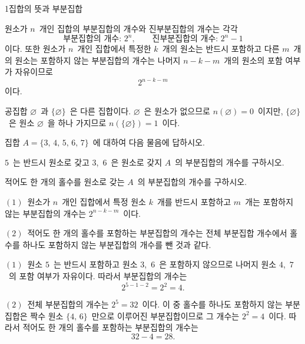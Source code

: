 \documentclass[10pt]{article}
\begin{document}
\begin{dmconcept}{1}{집합의 뜻과 부분집합}

원소가 $n$\ 개인 집합의 부분집합의 개수와 진부분집합의 개수는 각각
\begin{equation*}
  \text{부분집합의 개수: } 2^{n}, \qquad \text{진부분집합의 개수: } 2^{n} - 1
\end{equation*}
이다. 또한 원소가 $n$\ 개인 집합에서 특정한 $k$\ 개의 원소는 반드시 포함하고 다른 $m$\ 개의 원소는 포함하지 않는 부분집합의 개수는 나머지 $n - k - m$\ 개의 원소의 포함 여부가 자유이므로
\begin{equation*}
  2^{n - k - m}
\end{equation*}
이다.

\begin{dmnote}
공집합 $\varnothing$\ 과 $\{\varnothing\}$\ 은 다른 집합이다. $\varnothing$\ 은 원소가 없으므로 $n(\varnothing) = 0$\ 이지만, $\{\varnothing\}$\ 은 원소 $\varnothing$\ 을 하나 가지므로 $n(\{\varnothing\}) = 1$\ 이다.
\end{dmnote}

\end{dmconcept}

\newpage


\begin{dmproblem}
집합 $A = \{3,\, 4,\, 5,\, 6,\, 7\}$\ 에 대하여 다음 물음에 답하시오.

\vspace{3mm}
 $5$\ 는 반드시 원소로 갖고 $3$,\ $6$\ 은 원소로 갖지  $A$\ 의 부분집합의 개수를 구하시오.

\vspace{3mm}
 적어도 한 개의 홀수를 원소로 갖는 $A$\ 의 부분집합의 개수를 구하시오.
\end{dmproblem}

\begin{dmapproach}
$(1)$\ 원소가 $n$\ 개인 집합에서 특정 원소 $k$\ 개를 반드시 포함하고 $m$\ 개는 포함하지 않는 부분집합의 개수는 $2^{n - k - m}$\ 이다.

$(2)$\ 적어도 한 개의 홀수를 포함하는 부분집합의 개수는 전체 부분집합 개수에서 홀수를 하나도 포함하지 않는 부분집합의 개수를 뺀 것과 같다.
\end{dmapproach}

\begin{dmsolution}
$(1)$\ 원소 $5$\ 는 반드시 포함하고 원소 $3$,\ $6$\ 은 포함하지 않으므로 나머지 원소 $4$,\ $7$\ 의 포함 여부가 자유이다. 따라서 부분집합의 개수는
\[ 2^{5-1-2} = 2^{2} = 4. \]

$(2)$\ 전체 부분집합의 개수는 $2^{5} = 32$\ 이다. 이 중 홀수를 하나도 포함하지 않는 부분집합은 짝수 원소 $\{4,\, 6\}$\ 만으로 이루어진 부분집합이므로 그 개수는 $2^{2} = 4$\ 이다. 따라서 적어도 한 개의 홀수를 포함하는 부분집합의 개수는
\[ 32 - 4 = 28. \]
\end{dmsolution}
\end{document}
